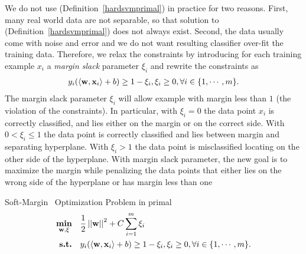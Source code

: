 We do not use (Definition~\ref{hardsvmprimal}) in practice for two reasons. 
First, many real world data are not separable, so that solution to (Definition~\ref{hardsvmprimal}) does not always exist.
Second, the data usually come with noise and error and we do not want resulting classifier over-fit the training data.
Therefore, we relax the constraints by introducing for each training example $x_i$ a \textit{margin slack} parameter $\xi_i$ and rewrite the constraints as 
\begin{align}
	y_i(\langle \mathbf {w}, \mathbf {x}_i \rangle + b) \ge 1-\xi_i, \xi_i\ge 0, \forall i\in\{1,\cdots,m\}. \label{softsvmconstraint}
\end{align}
The margin slack parameter $\xi_i$ will allow example with margin less than $1$ (the violation of the constraints).
In particular, with $\xi_i=0$ the data point $x_i$ is correctly classified, and lies either on the margin or on the correct side.
With $0<\xi_i\le 1$ the data point is correctly classified and lies between margin and separating hyperplane.
With $\xi_i>1$ the data point is misclassified locating on the other side of the hyperplane.
With margin slack parameter, the new goal is to maximize the margin while penalizing the data points that either lies on the wrong side of the hyperplane or has margin less than one
\begin{definition}{Soft-Margin \svm\ Optimization Problem in primal}\label{softsvmprimal}
	\begin{align*}
		\underset{\mathbf {w},\xi}{\textbf{min}} & \quad\frac{1}{2}\left|\left| \mathbf {w} \right|\right|^2 + C\sum_{i=1}^{m}\xi_i\\
		\textbf{s.t.} & \quad y_i(\langle \mathbf {w}, \mathbf {x}_i \rangle + b) \ge 1-\xi_i, \xi_i\ge 0, \forall i\in\{1,\cdots,m\}.
	\end{align*}
\end{definition}

